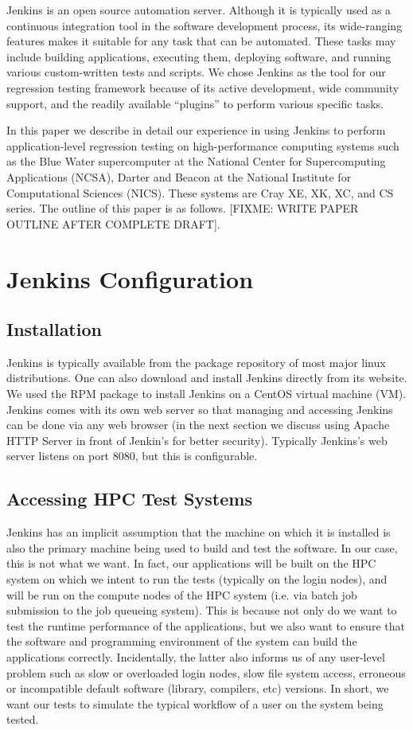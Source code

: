 \documentclass[10pt, conference, compsocconf]{IEEEtran}
\begin{document}
Jenkins is an open source automation server. 
Although it is typically used as a continuous integration tool in the software development process, its wide-ranging features makes it suitable for any task that can be automated. 
These tasks may include building applications, executing them, deploying software, and running various custom-written tests and scripts. 
We chose Jenkins as the tool for our regression testing framework because of its active development, wide community support, and the readily available ``plugins'' to perform various specific tasks.

In this paper we describe in detail our experience in using Jenkins to perform application-level regression testing on high-performance computing systems such as the Blue Water supercomputer at the National Center for Supercomputing Applications (NCSA), Darter and Beacon at the National Institute for Computational Sciences (NICS). 
These systems are Cray XE, XK, XC, and CS series. 
The outline of this paper is as follows. 
[FIXME: WRITE PAPER OUTLINE AFTER COMPLETE DRAFT].

\section{Jenkins Configuration}
\label{sec:JenkinsConfiguration}

\subsection{Installation}
Jenkins is typically available from the package repository of most major linux distributions. 
One can also download and install Jenkins directly from its website. 
We used the RPM package to install Jenkins on a CentOS virtual machine (VM). 
Jenkins comes with its own web server so that managing and accessing Jenkins can be done via any web browser (in the next section we discuss using Apache HTTP Server in front of Jenkin's for better security). 
Typically Jenkins's web server listens on port 8080, but this is configurable. 


\subsection{Accessing HPC Test Systems}
Jenkins has an implicit assumption that the machine on which it is installed is also the primary machine being used to build and test the software. 
In our case, this is not what we want. 
In fact, our applications will be built on the HPC system on which we intent to run the tests (typically on the login nodes), and will be run on the compute nodes of the HPC system (i.e. via batch job submission to the job queueing system). 
This is because not only do we want to test the runtime performance of the applications, but we also want to ensure that the software and programming environment of the system can build the applications correctly. 
Incidentally, the latter also informs us of any user-level problem such as slow or overloaded login nodes, slow file system access, erroneous or incompatible default software (library, compilers, etc) versions. 
In short, we want our tests to simulate the typical workflow of a user on the system being tested.
\end{document}
